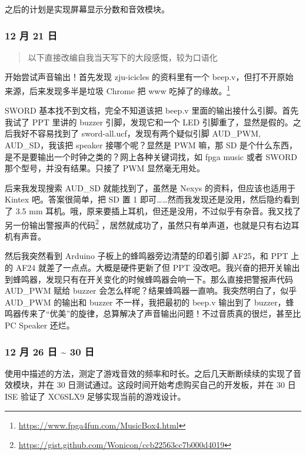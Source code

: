 \documentclass[hyperref,UTF8,12pt,a4paper]{ctexart}
\begin{document}
之后的计划是实现屏幕显示分数和音效模块。

\hypertarget{ux6708-21-ux65e5}{%
\subsubsection{12 月 21 日}\label{ux6708-21-ux65e5}}

\begin{quote}
以下直接改编自我当天写下的大段感慨，较为口语化
\end{quote}

开始尝试声音输出！首先发现 zju-icicles 的资料里有一个
beep.v，但打不开原始来源，后来发现多半是垃圾 Chrome 把 www
吃掉了的缘故。\footnote{\url{https://www.fpga4fun.com/MusicBox4.html}}

SWORD 基本找不到文档，完全不知道该把 beep.v
里面的输出接什么引脚。首先我试了 PPT 里讲的 buzzer 引脚，发现它和一个
LED 引脚重了，显然是假的。之后我好不容易找到了
sword-all.ucf，发现有两个疑似引脚 AUD\_PWM, AUD\_SD，我该把 speaker
接哪个呢？显然是 PWM 嘛，那 SD
是个什么东西，是不是要输出一个时钟之类的？网上各种关键词找，如 fpga
music 或者 SWORD 那个型号，并没有结果。只接了 PWM 显然毫无用处。

后来我发现搜索 AUD\_SD 就能找到了，虽然是 Nexys 的资料，但应该也适用于
Kintex 吧。答案很简单，把 SD 置 1
即可\ldots\ldots 然而我发现还是没用，然后隐约看到了 3.5 mm
耳机。哦，原来要插上耳机，但还是没用，不过似乎有杂音。我又找了另一份输出警报声的代码\footnote{\url{https://gist.github.com/Wonicon/ccb22563cc7b000d4019}}
，居然就成功了，虽然只有单声道，也就是只有右边耳机有声音。

然后我突然看到 Arduino 子板上的蜂鸣器旁边清楚的印着引脚 AF25，和 PPT
上的 AF24 就差了一点点。大概是硬件更新了但 PPT
没改吧。我兴奋的把开关输出到蜂鸣器，发现只有在开关变化的时候蜂鸣器会响一下。那么直接把警报声代码
AUD\_PWM 赋给 buzzer 会怎么样呢？结果蜂鸣器一直响。我突然明白了，似乎
AUD\_PWM 的输出和 buzzer 不一样，我把最初的 beep.v 输出到了
buzzer，蜂鸣器传来了``优美''的旋律，总算解决了声音输出问题！不过音质真的很烂，甚至比
PC Speaker 还烂。

\hypertarget{ux6708-26-ux65e5-30-ux65e5}{%
\subsubsection{12 月 26 日 \textasciitilde{} 30
日}\label{ux6708-26-ux65e5-30-ux65e5}}

使用中描述的方法，测定了游戏音效的频率和时长。之后几天断断续续的实现了音效模块，并在
30 日测试通过。这段时间开始考虑购买自己的开发板，并在 30 日 ISE 验证了
XC6SLX9 足够实现当前的游戏设计。
\end{document}
